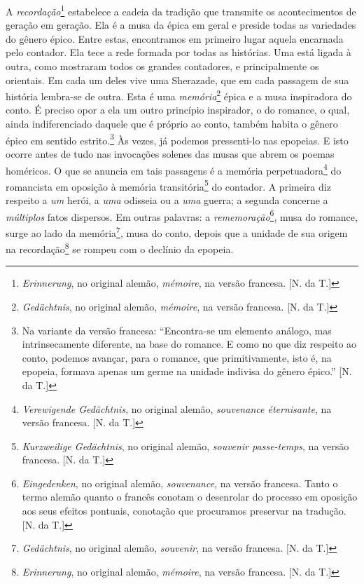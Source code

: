 A \emph{recordação}\footnote{\emph{Erinnerung}, no original alemão,
  \emph{mémoire}, na versão francesa. {[}N. da T.{]}} estabelece a
cadeia da tradição que transmite os acontecimentos de geração em
geração. Ela é a musa da épica em geral e preside todas as variedades do
gênero épico. Entre estas, encontramos em primeiro lugar aquela
encarnada pelo contador. Ela tece a rede formada por todas as histórias.
Uma está ligada à outra, como mostraram todos os grandes contadores, e
principalmente os orientais. Em cada um deles vive uma Sherazade, que em
cada passagem de sua história lembra-se de outra. Esta é uma
\emph{memória}\footnote{\emph{Gedächtnis}, no original alemão,
  \emph{mémoire}, na versão francesa. {[}N. da T.{]}} épica e a musa
inspiradora do conto. É preciso opor a ela um outro princípio
inspirador, o do romance, o qual, ainda indiferenciado daquele que é
próprio ao conto, também habita o gênero épico em sentido
estrito.\footnote{Na variante da versão francesa: ``Encontra-se um
  elemento análogo, mas intrinsecamente diferente, na base do romance. E
  como no que diz respeito ao conto, podemos avançar, para o romance,
  que primitivamente, isto é, na epopeia, formava apenas um germe na
  unidade indivisa do gênero épico.'' {[}N. da T.{]}} Às vezes, já
podemos pressenti-lo nas epopeias. E isto ocorre antes de tudo nas
invocações solenes das musas que abrem os poemas homéricos. O que se
anuncia em tais passagens é a memória perpetuadora\footnote{\emph{Verewigende
  Gedächtnis}, no original alemão, \emph{souvenance éternisante}, na
  versão francesa. {[}N. da T.{]}} do romancista em oposição à memória
transitória\footnote{\emph{Kurzweilige Gedächtnis}, no original alemão,
  \emph{souvenir passe-temps}, na versão francesa. {[}N. da T.{]}} do
contador. A primeira diz respeito a \emph{um} herói, a \emph{uma}
odisseia ou a \emph{uma} guerra; a segunda concerne a \emph{múltiplos}
fatos dispersos. Em outras palavras: a \emph{rememoração}\footnote{\emph{Eingedenken},
  no original alemão, \emph{souvenance}, na versão francesa. Tanto o
  termo alemão quanto o francês conotam o desenrolar do processo em
  oposição aos seus efeitos pontuais, conotação que procuramos preservar
  na tradução. {[}N. da T.{]}}, musa do romance, surge ao lado da
memória\footnote{\emph{Gedächtnis}, no original alemão, \emph{souvenir},
  na versão francesa. {[}N. da T.{]}}, musa do conto, depois que a
unidade de sua origem na recordação\footnote{\emph{Erinnerung}, no
  original alemão, \emph{mémoire}, na versão francesa. {[}N. da T.{]}}
se rompeu com o declínio da epopeia.

